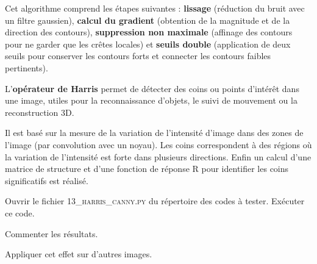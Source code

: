 Cet algorithme comprend les étapes suivantes : \textbf{lissage} (réduction du bruit avec un filtre gaussien), \textbf{calcul du gradient} (obtention de la magnitude et de la direction des contours), \textbf{suppression non maximale} (affinage des contours pour ne garder que les crêtes locales) et \textbf{seuils double} (application de deux seuils pour conserver les contours forts et connecter les contours faibles pertinents).

\medskip

L'\textbf{opérateur de Harris} permet de détecter des coins ou points d'intérêt dans une image, utiles pour la reconnaissance d'objets, le suivi de mouvement ou la reconstruction 3D.

Il est basé sur la mesure de la variation de l'intensité d'image dans des zones de l'image (par convolution avec un noyau). Les coins correspondent à des régions où la variation de l'intensité est forte dans plusieurs directions. Enfin un calcul d'une matrice de structure et d'une fonction de réponse R pour identifier les coins significatifs est réalisé.

\medskip

\Manip Ouvrir le fichier \textsc{13\_harris\_canny.py} du répertoire des codes à tester. Exécuter ce code.

\Quest Commenter les résultats. 

\Manip Appliquer cet effet sur d'autres images.


